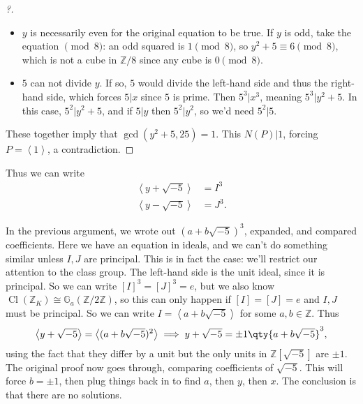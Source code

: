 \begin{example}
\begin{proof}[?]
\begin{itemize}
\item
  \(y\) is necessarily even for the original equation to be true. If
  \(y\) is odd, take the equation \(\pmod 8\): an odd squared is
  \(1\pmod 8\), so \(y^2 +5 \equiv 6 \pmod 8\), which is not a cube in
  \({\mathbb{Z}}/8\) since any cube is \(0\pmod 8\).
\item
  \(5\) can not divide \(y\). If so, \(5\) would divide the left-hand
  side and thus the right-hand side, which forces \(5\mathrel{\Big|}x\)
  since \(5\) is prime. Then \(5^3 \mathrel{\Big|}x^3\), meaning
  \(5^3 \mathrel{\Big|}y^2 + 5\). In this case,
  \(5^2 \mathrel{\Big|}y^2 + 5\), and if \(5\mathrel{\Big|}y\) then
  \(5^2 \mathrel{\Big|}y^2\), so we'd need \(5^2 \mathrel{\Big|}5\).
\end{itemize}

These together imply that \(\gcd(y^2 + 5, 25) = 1\). This
\(N(P) \mathrel{\Big|}1\), forcing
\(P = \left\langle{ 1 }\right\rangle\), a contradiction.

\end{proof}

Thus we can write
\begin{align*}
\left\langle{ y + \sqrt{-5} }\right\rangle  &= I^3 \\
\left\langle{ y - \sqrt{-5} }\right\rangle  &= J^3
.\end{align*}

In the previous argument, we wrote out \((a + b \sqrt{-5} )^3\),
expanded, and compared coefficients. Here we have an equation in ideals,
and we can't do something similar unless \(I, J\) are principal. This is
in fact the case: we'll restrict our attention to the class group. The
left-hand side is the unit ideal, since it is principal. So we can write
\([I]^3 = [J]^3 = e\), but we also know
\(\operatorname{Cl}({\mathbb{Z}}_K) \cong {\mathbb{G}}_a({\mathbb{Z}}/2{\mathbb{Z}})\),
so this can only happen if \([I] = [J] = e\) and \(I, J\) must be
principal. So we can write
\(I = \left\langle{ a + b \sqrt{-5}}\right\rangle\) for some
\(a, b \in {\mathbb{Z}}\). Thus
\begin{align*}
\left\langle{ y + \sqrt{-5} }\right\rangle = \left\langle{ (a + b \sqrt{-5} )^2 }\right\rangle \implies y + \sqrt{-5} = \pm 1 \qty { a + b \sqrt{-5} }^3  
,\end{align*}
using the fact that they differ by a unit but the only units in
\({\mathbb{Z}}[ \sqrt{-5} ]\) are \(\pm 1\). The original proof now goes
through, comparing coefficients of \(\sqrt{-5}\). This will force
\(b = \pm 1\), then plug things back in to find \(a\), then \(y\), then
\(x\). The conclusion is that there are no solutions.

\end{example}

